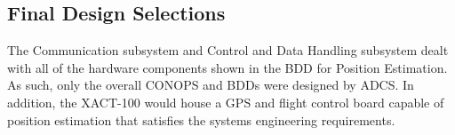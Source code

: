 \documentclass[conf]{new-aiaa}
\begin{document}


\subsection{Final Design Selections}
The Communication subsystem and Control and Data Handling subsystem dealt with all of the hardware components shown in the BDD for Position Estimation. As such, only the overall CONOPS and BDDs were designed by ADCS. In addition, the XACT-100 would house a GPS and flight control board capable of position estimation that satisfies the systems engineering requirements. 


\end{document}
